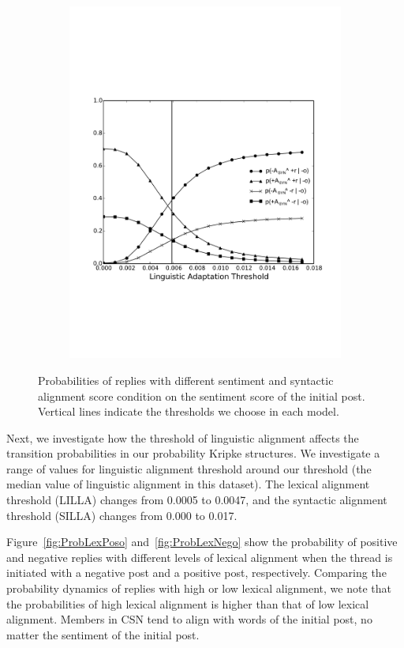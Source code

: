 \documentclass[man,biblatex,floatsintext]{apa6}
\newcommand{\up}{\vspace*{-12pt}}
\begin{document}
\begin{figure}[!htb]
\begin{subfigure}{.5\textwidth}
  \includegraphics[width=\linewidth]{Figures/SynAnegi_new_rob_New_Enlarge.pdf}
  \caption{\label{fig:ProbSynNego}}
\end{subfigure}%
\caption{Probabilities of replies with different sentiment and syntactic alignment score condition on the sentiment score of the initial post. Vertical lines indicate the thresholds we choose in each model.}
\label{fig:Probability_Change_Syn}
\up
\end{figure}


Next, we investigate how the threshold of linguistic alignment affects the transition probabilities in our probability Kripke structures. We investigate a range of values for linguistic alignment threshold around our threshold (the median value of linguistic alignment in this dataset). The lexical alignment threshold (LILLA) changes from 0.0005 to 0.0047, and the syntactic alignment threshold (SILLA) changes from 0.000 to 0.017.  


Figure~\ref{fig:ProbLexPoso} and~\ref{fig:ProbLexNego} show the probability of positive and negative replies with different levels of lexical alignment when the thread is initiated with a negative post and a positive post, respectively. Comparing the probability dynamics of replies with high or low lexical alignment, we note that the probabilities of high lexical alignment is higher than that of low lexical alignment. Members in CSN tend to align with words of the initial post, no matter the sentiment of the initial post. 
\end{document}
